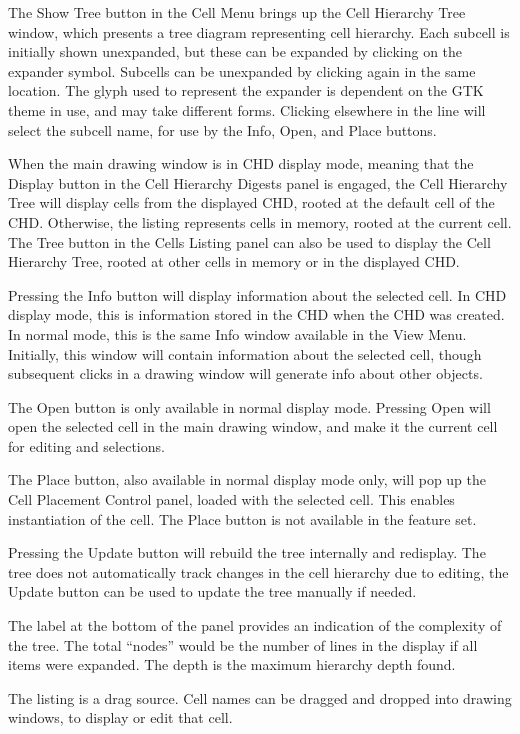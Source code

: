The {\cb Show Tree} button in the {\cb Cell Menu} brings up the {\cb
Cell Hierarchy Tree} window, which presents a tree diagram
representing cell hierarchy.  Each subcell is initially shown
unexpanded, but these can be expanded by clicking on the expander
symbol.  Subcells can be unexpanded by clicking again in the same
location.  The glyph used to represent the expander is dependent on
the GTK theme in use, and may take different forms.  Clicking
elsewhere in the line will select the subcell name, for use by the
{\cb Info}, {\cb Open}, and {\cb Place} buttons.

When the main drawing window is in CHD display mode, meaning that the
{\cb Display} button in the {\cb Cell Hierarchy Digests} panel is
engaged, the {\cb Cell Hierarchy Tree} will display cells from the
displayed CHD, rooted at the default cell of the CHD.  Otherwise, the
listing represents cells in memory, rooted at the current cell.  The
{\cb Tree} button in the {\cb Cells Listing} panel can also be used to
display the {\cb Cell Hierarchy Tree}, rooted at other cells in memory
or in the displayed CHD.

Pressing the {\cb Info} button will display information about the
selected cell.  In CHD display mode, this is information stored in the
CHD when the CHD was created.  In normal mode, this is the same {\cb
Info} window available in the {\cb View Menu}.  Initially, this window
will contain information about the selected cell, though subsequent
clicks in a drawing window will generate info about other objects.

The {\cb Open} button is only available in normal display mode. 
Pressing {\cb Open} will open the selected cell in the main drawing
window, and make it the current cell for editing and selections.

The {\cb Place} button, also available in normal display mode only,
will pop up the {\cb Cell Placement Control} panel, loaded with the
selected cell.  This enables instantiation of the cell.  The {\cb
Place} button is not available in the {\Xiv} feature set.

Pressing the {\cb Update} button will rebuild the tree internally and
redisplay.  The tree does not automatically track changes in the cell
hierarchy due to editing, the {\cb Update} button can be used to
update the tree manually if needed.

The label at the bottom of the panel provides an indication of the
complexity of the tree.  The total ``nodes'' would be the number of
lines in the display if all items were expanded.  The depth is the
maximum hierarchy depth found.

The listing is a drag source.  Cell names can be dragged and dropped
into drawing windows, to display or edit that cell.

